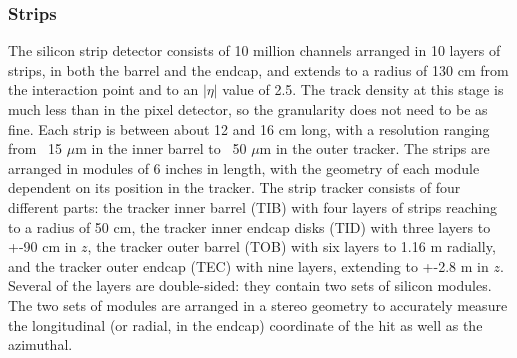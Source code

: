 \subsubsection{Strips}
The silicon strip detector consists of 10 million channels
arranged in 10 layers of strips, 
in both the barrel and the endcap,
and extends to a radius of 130 cm from the interaction point
and to an $|\eta|$ value of 2.5.  
The track density at this stage is much less than in the pixel detector,
so the granularity does not need to be as fine.
Each strip is between about 12 and 16 cm long,
with a resolution ranging from ~15 $\mu$m in the inner barrel
to ~50 $\mu$m in the outer tracker.  
The strips are arranged in modules of 6 inches in length, 
with the geometry of each module dependent 
on its position in the tracker.  
The strip tracker consists of four different parts: 
the tracker inner barrel (TIB) with four layers of strips reaching to a radius of 50 cm, 
the tracker inner endcap disks (TID) with three layers to +-90 cm in $z$, 
the tracker outer barrel (TOB) with six layers to 1.16 m radially, 
and the tracker outer endcap (TEC) with nine layers, extending to +-2.8 m in $z$. 
Several of the layers are double-sided: 
they contain two sets of silicon modules.  
The two sets of modules are arranged in a stereo
geometry to accurately measure the longitudinal
(or radial, in the endcap) coordinate of the hit 
as well as the azimuthal.  


